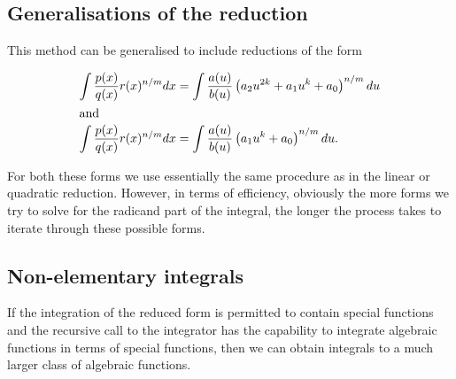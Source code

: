 \documentclass[12pt]{article}
\numberwithin{equation}{section}
\theoremstyle{definition}
\begin{document}
\subsection{Generalisations of the reduction}

This method can be generalised to include reductions of the form 

\begin{align*}
\int \frac{p(x)}{q(x)}r(x)^{n/m}dx &= \int \frac{a(u)}{b(u)}\left(a_2u^{2k}+a_1u^k+a_0\right)^{n/m}du \\
\intertext{and}
\int \frac{p(x)}{q(x)}r(x)^{n/m}dx &= \int \frac{a(u)}{b(u)}\left(a_1u^k+a_0\right)^{n/m}du.\\
\end{align*}

For both these forms we use essentially the same procedure as in the linear or quadratic 
reduction. However, in terms of efficiency, obviously the more forms we try to solve for 
the radicand part of the integral, the longer the process takes to iterate through these 
possible forms. 

\subsection{Non-elementary integrals}

If the integration of the reduced form is permitted to contain special functions and the 
recursive call to the integrator has the capability to integrate algebraic functions 
in terms of special functions, then we can obtain integrals to a much larger class of 
algebraic functions. 
\end{document}
